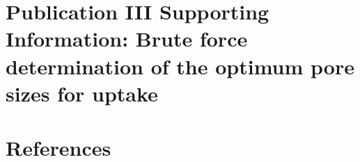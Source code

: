 \newpage
\section[Publication III Supporting Information]{\texorpdfstring{Publication III Supporting Information: Brute force determination of the optimum pore sizes for  uptake}{Publication III Supporting Information: Brute force determination of the optimum pore sizes for CO2 uptake}}

\newpage

\setlength{\originalVOffset}{\voffset}   
\setlength{\originalHOffset}{\hoffset}

\setlength{\voffset}{0cm}
\setlength{\hoffset}{0cm}
%
\setlength{\voffset}{\originalVOffset}
\setlength{\hoffset}{\originalHOffset}

\section*{References}